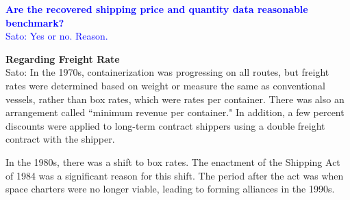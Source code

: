 \documentclass[11pt]{article}
\begin{document}
\textcolor{blue}{\textbf{Are the recovered shipping price and quantity data reasonable benchmark?} \\
Sato: Yes or no. Reason.
}


\textbf{Regarding Freight Rate}  \\
Sato: In the 1970s, containerization was progressing on all routes, but freight rates were determined based on weight or measure the same as conventional vessels, rather than box rates, which were rates per container. There was also an arrangement called ``minimum revenue per container." In addition, a few percent discounts were applied to long-term contract shippers using a double freight contract with the shipper. 

In the 1980s, there was a shift to box rates. The enactment of the Shipping Act of 1984 was a significant reason for this shift. The period after the act was when space charters were no longer viable, leading to forming alliances in the 1990s.

\end{document}
